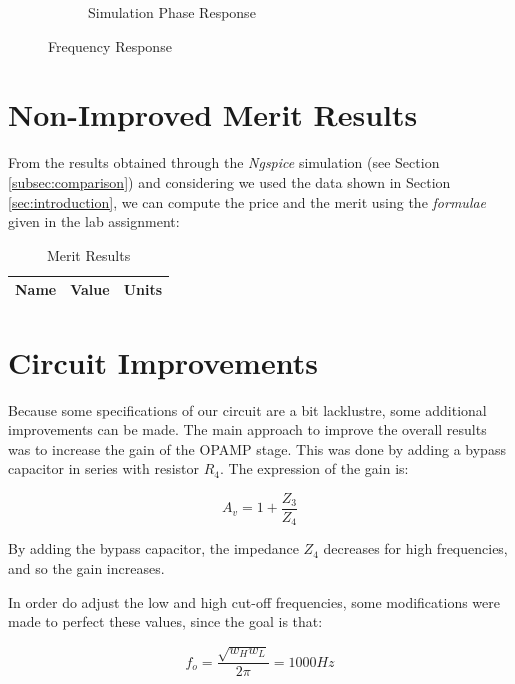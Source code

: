 \begin{figure}[h]
\begin{subfigure}{.5\textwidth}
    \caption{Simulation Phase Response}
\end{subfigure}
\caption{Frequency Response}
\label{fig:freq_resp}
\end{figure}

\clearpage

\section{Non-Improved Merit Results}
\label{sec:merit}

From the results obtained through the \textit{Ngspice} simulation (see Section \ref{subsec:comparison}) and considering we used the data shown in Section \ref{sec:introduction}, we can compute the price and the merit using the \textit{formulae} given in the lab assignment:

\begin{table}[h]
    \centering
    \begin{tabular}{|l|c|c|}
    \hline
    {\bf Name} & {\bf Value} & {\bf Units} \\ \hline
    
   \end{tabular}
   \caption{Merit Results}
   \label{tab:merit}
\end{table}

\section{Circuit Improvements}
\label{sec:circuit_improvements}

Because some specifications of our circuit are a bit lacklustre, some additional improvements can be made. The main approach to improve the overall results was to increase the gain of the OPAMP stage. This was done by adding a bypass capacitor in series with resistor $R_4$. The expression of the gain is:

\begin{equation}
    A_v=1+\frac{Z_3}{Z_4}
\end{equation}

By adding the bypass capacitor, the impedance $Z_4$ decreases for high frequencies, and so the gain increases.

In order do adjust the low and high cut-off frequencies, some modifications were made to perfect these values, since the goal is that:

\begin{equation}
    f_o= \frac{\sqrt{w_H w_L}}{2\pi} = 1000 Hz
\end{equation}


